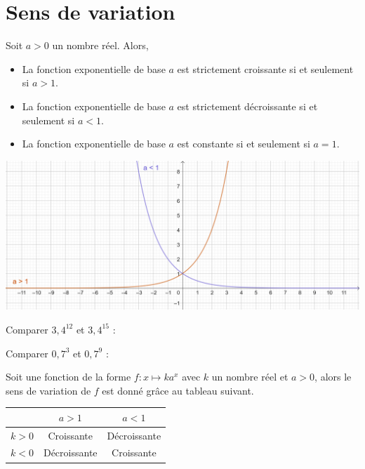 \documentclass{article}
\begin{document}
\section{Sens de variation}
\begin{tcolorbox}
\begin{proposition}
Soit $a > 0$ un nombre réel. Alors,
\begin{itemize}
\item La fonction exponentielle de base $a$ est strictement croissante si et seulement si $a > 1$. 
\item La fonction exponentielle de base $a$ est strictement décroissante si et seulement si $a < 1$. 
\item La fonction exponentielle de base $a$ est constante si et seulement si $a = 1$. 
\end{itemize}
\end{proposition}
\end{tcolorbox}
\begin{center}
\includegraphics[width=\textwidth]{Variation_exponentielle.png}
\end{center}
\begin{example}
\hfill
\begin{enumquestions}
\item Comparer $3,4^{12}$ et $3,4^{15}$ : \answersline
\item Comparer $0,7^{3}$ et $0,7^{9}$ : \answersline
\end{enumquestions}
\end{example}
\begin{tcolorbox}
\begin{proposition}
Soit une fonction de la forme $f : x \mapsto k a^x$ avec $k$ un nombre réel et $a > 0$, alors le sens de variation de $f$ est donné grâce au tableau suivant.
\begin{center}
\begin{tabular}{|c|c|c|}
\hline
&$a > 1$&$a < 1$\\
\hline
$k > 0$& Croissante & Décroissante\\
\hline
$k < 0$& Décroissante & Croissante\\
\hline
\end{tabular}
\end{center}
\end{proposition}
\end{tcolorbox}
\end{document}

